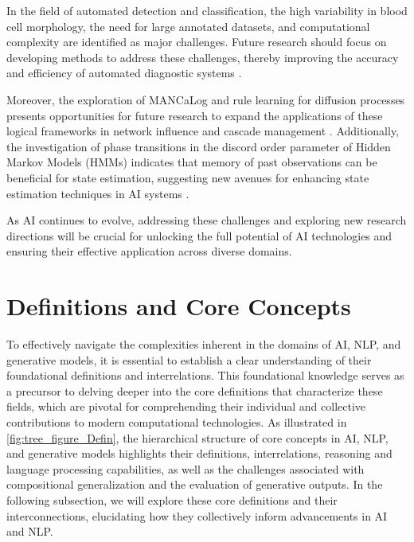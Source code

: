 In the field of automated detection and classification, the high variability in blood cell morphology, the need for large annotated datasets, and computational complexity are identified as major challenges. Future research should focus on developing methods to address these challenges, thereby improving the accuracy and efficiency of automated diagnostic systems \cite{zolfaghari2023surveyautomateddetectionclassification}.



Moreover, the exploration of MANCaLog and rule learning for diffusion processes presents opportunities for future research to expand the applications of these logical frameworks in network influence and cascade management \cite{shakarian2022reasoningcomplexnetworkslogic}. Additionally, the investigation of phase transitions in the discord order parameter of Hidden Markov Models (HMMs) indicates that memory of past observations can be beneficial for state estimation, suggesting new avenues for enhancing state estimation techniques in AI systems \cite{lathouwers2017memorypaysdiscordhidden}.



As AI continues to evolve, addressing these challenges and exploring new research directions will be crucial for unlocking the full potential of AI technologies and ensuring their effective application across diverse domains.









\section{Definitions and Core Concepts} \label{sec:Definitions and Core Concepts}


To effectively navigate the complexities inherent in the domains of AI, NLP, and generative models, it is essential to establish a clear understanding of their foundational definitions and interrelations. This foundational knowledge serves as a precursor to delving deeper into the core definitions that characterize these fields, which are pivotal for comprehending their individual and collective contributions to modern computational technologies. As illustrated in \autoref{fig:tree_figure_Defin}, the hierarchical structure of core concepts in AI, NLP, and generative models highlights their definitions, interrelations, reasoning and language processing capabilities, as well as the challenges associated with compositional generalization and the evaluation of generative outputs. In the following subsection, we will explore these core definitions and their interconnections, elucidating how they collectively inform advancements in AI and NLP.

